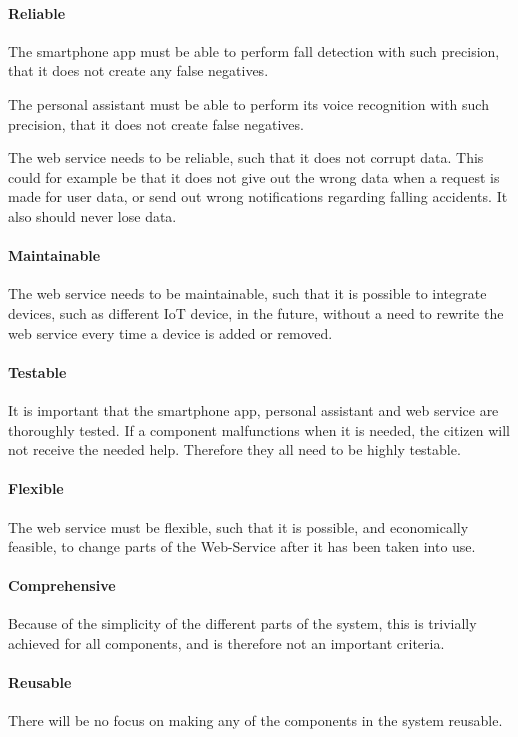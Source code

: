\paragraph{Reliable}
The smartphone app must be able to perform fall detection with such precision, that it does not create any false negatives.

The personal assistant must be able to perform its voice recognition with such precision, that it does not create false negatives.

The web service needs to be reliable, such that it does not corrupt data. This could for example be that it does not give out the wrong data when a request is made for user data, or send out wrong notifications regarding falling accidents. It also should never lose data.

\paragraph{Maintainable}
The web service needs to be maintainable, such that it is possible to integrate devices, such as different IoT device, in the future, without a need to rewrite the web service every time a device is added or removed.

\paragraph{Testable}
It is important that the smartphone app, personal assistant and web service are thoroughly tested. If a component malfunctions when it is needed, the citizen will not receive the needed help. Therefore they all need to be highly testable.

\paragraph{Flexible}
The web service must be flexible, such that it is possible, and economically feasible, to change parts of the Web-Service after it has been taken into use.

\paragraph{Comprehensive}
Because of the simplicity of the different parts of the system, this is trivially achieved for all components, and is therefore not an important criteria.

\paragraph{Reusable}
There will be no focus on making any of the components in the system reusable.

